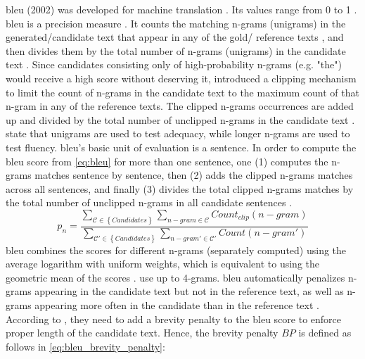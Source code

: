 \ac{bleu} (2002) was developed for machine translation \citep{palivela_optimization_2021,zhou_paraphrase_2021,papineni_bleu_2001}.
Its values range from 0 to 1 \citep{papineni_bleu_2001}.
\ac{bleu} is a precision measure \citep{kurt_pehlivanoglu_comparative_2024,papineni_bleu_2001}.
It counts the matching n-grams (unigrams) in the generated/candidate text that appear in any of the gold/ reference texts \citep{palivela_optimization_2021,papineni_bleu_2001}, 
and then divides them by the total number of n-grams (unigrams) in the candidate text \citep{papineni_bleu_2001}.
Since candidates consisting only of high-probability n-grams (e.g. "the") would receive a high score without deserving it, 
\citet{papineni_bleu_2001} introduced a clipping mechanism to limit the count of n-grams in the candidate text 
to the maximum count of that n-gram in any of the reference texts.
The clipped n-grams occurrences are added up and divided by the total number 
of unclipped n-grams in the candidate text \citep{papineni_bleu_2001}.
\citet{papineni_bleu_2001} state that unigrams are used to test adequacy, while longer n-grams are used to test fluency.
\ac{bleu}'s basic unit of evaluation is a sentence. 
In order to compute the \ac{bleu} score from \autoref{eq:bleu} for more than one sentence, 
one (1) computes the n-grams matches sentence by sentence, 
then (2) adds the clipped n-grams matches across all sentences, 
and finally (3) divides the total clipped n-grams matches by 
the total number of unclipped n-grams in all candidate sentences \citep{papineni_bleu_2001}.
\begin{equation}
    p_n = \frac{\sum_{\mathcal{C} \in \left\{ Candidates \right\}}\sum_{n-gram \in\mathcal{C}}Count_{clip}(n-gram)}{\sum_{\mathcal{C'} \in \left\{ Candidates \right\}}\sum_{n-gram' \in\mathcal{C'}}Count(n-gram')}
\label{eq:bleu}
\end{equation}
\ac{bleu} combines the scores for different n-grams (separately computed) using the average logarithm with uniform weights, 
which is equivalent to using the geometric mean of the scores \citep{papineni_bleu_2001,banerjee_METEOR_2005}.
\citet{gohsen_captions_2023} use up to 4-grams.
\ac{bleu} automatically penalizes n-grams appearing in the candidate text but not in the reference text, 
as well as n-grams appearing more often in the candidate than in the reference text \citep{papineni_bleu_2001}.
According to \citet{papineni_bleu_2001}, they need to add a brevity penalty to the \ac{bleu} score 
to enforce proper length of the candidate text. 
Hence, the brevity penalty $BP$ is defined as follows in \autoref{eq:bleu_brevity_penalty}:
